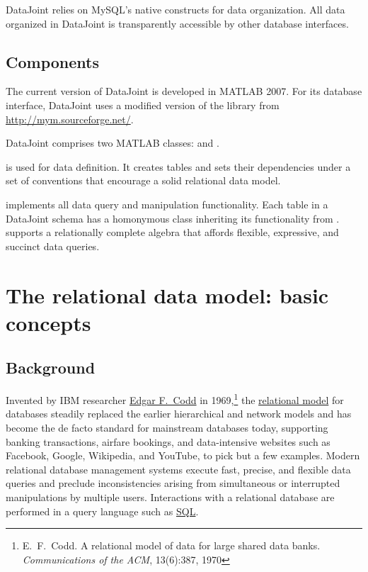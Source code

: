 \documentclass[10pt]{article}
\begin{document}
DataJoint relies on MySQL's native constructs for data organization.  All data organized in DataJoint is transparently accessible by other database interfaces.

\subsection{Components}
The current version of DataJoint is developed in MATLAB 2007. For its database interface, DataJoint uses a modified version of the   library from \url{http://mym.sourceforge.net/}.

DataJoint comprises two MATLAB classes:  and .  

 is used for data definition. It creates tables and sets their dependencies under a set of conventions that encourage a solid relational data model. 

 implements all data query and manipulation functionality. Each table in a DataJoint schema has a homonymous class inheriting its functionality from .  supports a relationally complete algebra that affords flexible, expressive, and succinct data queries.

\newpage\section{The relational data model: basic concepts}
\subsection{Background}
Invented by IBM researcher \href{http://en.wikipedia.org/wiki/Edgar_F._Codd}{Edgar F.~Codd} in 1969,\footnote{E.~F.~Codd. A relational model of data for large shared data banks. {\em Communications of the ACM}, 13(6):387, 1970} the \href{http://en.wikipedia.org/wiki/Relational_model}{relational model} for databases steadily replaced the earlier hierarchical and network models and has become the de facto standard for mainstream databases today, supporting banking transactions, airfare bookings, and data-intensive websites such as Facebook, Google, Wikipedia, and YouTube, to pick but a few examples.  Modern relational database management systems  execute fast, precise, and flexible data queries and preclude inconsistencies arising from simultaneous or interrupted manipulations by multiple users. Interactions with a relational database are performed in a query language such as \href{http://en.wikipedia.org/wiki/SQL}{SQL}. 
\end{document}
